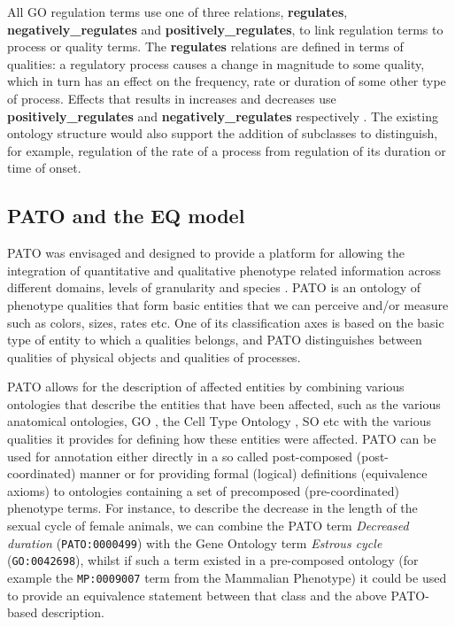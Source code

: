 \documentclass{bioinfo}
\renewcommand{\cite}{\citep}
\begin{document}
\begin{methods}
All GO regulation terms use one of three relations, {\bf regulates},
{\bf negatively\_regulates} and {\bf positively\_regulates}, to link
regulation terms to process or quality terms. The {\bf regulates}
relations are defined in terms of qualities: a regulatory process
causes a change in magnitude to some quality, which in turn has an
effect on the frequency, rate or duration of some other type of
process. Effects that results in increases and decreases use {\bf
  positively\_regulates} and {\bf negatively\_regulates} respectively
\cite{Mungall2010go}. The existing ontology structure would also
support the addition of subclasses to distinguish, for example,
regulation of the rate of a process from regulation of its duration or
time of onset.

\subsection{PATO and the EQ model}
PATO was envisaged and designed to provide a platform for allowing the
integration of quantitative and qualitative phenotype related
information across different domains, levels of granularity and
species \cite{Gkoutos2005}.  PATO is an ontology of phenotype
qualities that form basic entities that we can perceive and/or measure
such as colors, sizes, rates etc. One of its classification axes is
based on the basic type of entity to which a qualities belongs, and
PATO distinguishes between qualities of physical objects and qualities
of processes.

PATO allows for the description of affected entities by combining
various ontologies that describe the entities that have been affected,
such as the various anatomical ontologies, GO \cite {Ashburner2000short},
the Cell Type Ontology \cite {Bard2005}, SO \cite {Eilbeck2005} etc
with the various qualities it provides for defining how these entities
were affected.  PATO can be used for annotation either directly in a
so called post-composed (post-coordinated) manner or for providing
formal (logical) definitions (equivalence axioms) to ontologies
containing a set of precomposed (pre-coordinated) phenotype terms. For
instance, to describe the decrease in the length of the sexual cycle
of female animals, we can combine the PATO term \textit{Decreased
  duration} ({\tt PATO:0000499}) with the Gene Ontology term
\textit{Estrous cycle} ({\tt GO:0042698}), whilst if such a term
existed in a pre-composed ontology (for example the {\tt MP:0009007}
term from the Mammalian Phenotype) it could be used to provide an
equivalence statement between that class and the above PATO-based
description.


\end{methods}
\end{document}

